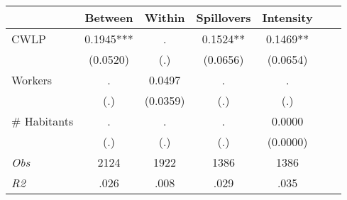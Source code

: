 \begin{tabular}{l*{6}{c}}\hline&\multicolumn{1}{c}{Between}&\multicolumn{1}{c}{Within}&\multicolumn{1}{c}{Spillovers}&\multicolumn{1}{c}{Intensity}\\ \hline 
CWLP & 0.1945*** & . & 0.1524** & 0.1469** \\
 & (0.0520) & (.) & (0.0656) & (0.0654) \\
Workers & . & 0.0497 & . & . \\
 & (.) & (0.0359) & (.) & (.) \\
\# Habitants & . & . & . & 0.0000 \\
  & (.) & (.) & (.) & (0.0000) \\
\hline \textit{Obs} & 2124 & 1922 & 1386 & 1386  \\ \textit{R2} & .026 & .008 & .029 & .035 \\ \hline \end{tabular}
